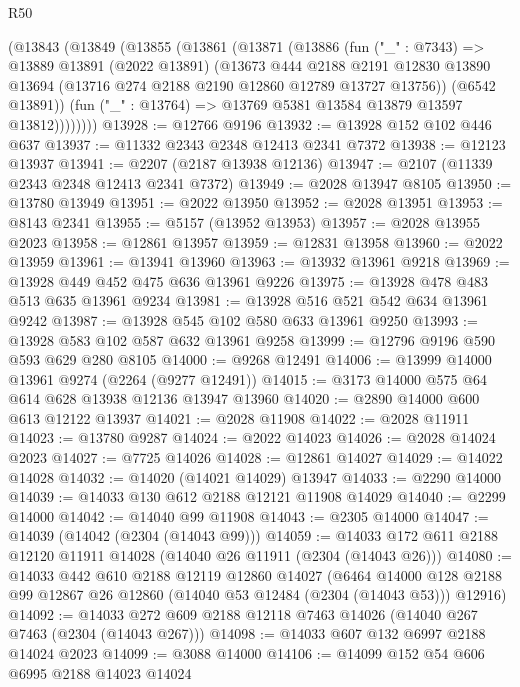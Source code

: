\begin{lexlean}{R50}
\begin{coremodule}
      (@13843
        (@13849
          (@13855
            (@13861
              (@13871
                (@13886
                  (fun ("_" : @7343) =>
                  @13889
                    @13891
                    (@2022 @13891)
                    (@13673
                      @444
                      @2188
                      @2191
                      @12830
                      @13890
                      @13694
                      (@13716 @274 @2188 @2190 @12860 @12789 @13727 @13756))
                    (@6542 @13891))
                  (fun ("_" : @13764) => @13769 @5381 @13584 @13879 @13597 @13812))))))))
@13928 := @12766 @9196
@13932 := @13928 @152 @102 @446 @637
@13937 := @11332 @2343 @2348 @12413 @2341 @7372
@13938 := @12123 @13937
@13941 := @2207 (@2187 @13938 @12136)
@13947 := @2107 (@11339 @2343 @2348 @12413 @2341 @7372)
@13949 := @2028 @13947 @8105
@13950 := @13780 @13949
@13951 := @2022 @13950
@13952 := @2028 @13951
@13953 := @8143 @2341
@13955 := @5157 (@13952 @13953)
@13957 := @2028 @13955 @2023
@13958 := @12861 @13957
@13959 := @12831 @13958
@13960 := @2022 @13959
@13961 := @13941 @13960
@13963 := @13932 @13961 @9218
@13969 := @13928 @449 @452 @475 @636 @13961 @9226
@13975 := @13928 @478 @483 @513 @635 @13961 @9234
@13981 := @13928 @516 @521 @542 @634 @13961 @9242
@13987 := @13928 @545 @102 @580 @633 @13961 @9250
@13993 := @13928 @583 @102 @587 @632 @13961 @9258
@13999 := @12796 @9196 @590 @593 @629 @280 @8105
@14000 := @9268 @12491
@14006 := @13999 @14000 @13961 @9274 (@2264 (@9277 @12491))
@14015 := @3173 @14000 @575 @64 @614 @628 @13938 @12136 @13947 @13960
@14020 := @2890 @14000 @600 @613 @12122 @13937
@14021 := @2028 @11908
@14022 := @2028 @11911
@14023 := @13780 @9287
@14024 := @2022 @14023
@14026 := @2028 @14024 @2023
@14027 := @7725 @14026
@14028 := @12861 @14027
@14029 := @14022 @14028
@14032 := @14020 (@14021 @14029) @13947
@14033 := @2290 @14000
@14039 := @14033 @130 @612 @2188 @12121 @11908 @14029
@14040 := @2299 @14000
@14042 := @14040 @99 @11908
@14043 := @2305 @14000
@14047 := @14039 (@14042 (@2304 (@14043 @99)))
@14059 := @14033 @172 @611 @2188 @12120 @11911 @14028 (@14040 @26 @11911 (@2304 (@14043 @26)))
@14080 := @14033
    @442
    @610
    @2188
    @12119
    @12860
    @14027
    (@6464 @14000 @128 @2188 @99 @12867 @26 @12860 (@14040 @53 @12484 (@2304 (@14043 @53))) @12916)
@14092 := @14033 @272 @609 @2188 @12118 @7463 @14026 (@14040 @267 @7463 (@2304 (@14043 @267)))
@14098 := @14033 @607 @132 @6997 @2188 @14024 @2023
@14099 := @3088 @14000
@14106 := @14099 @152 @54 @606 @6995 @2188 @14023 @14024

\end{coremodule}
\end{lexlean}
